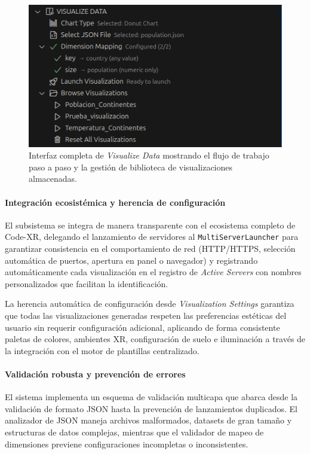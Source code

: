 \documentclass[a4paper, 12pt]{book}
\begin{document}
\begin{figure}[H]
\centering
\includegraphics[width=0.70\linewidth]{img/ui-visualize-data.png}
\caption{Interfaz completa de \emph{Visualize Data} mostrando el flujo de trabajo paso a paso y la gestión de biblioteca de visualizaciones almacenadas.}
\label{fig:ui-visualize-data}
\end{figure}

\paragraph{Integración ecosistémica y herencia de configuración}
El subsistema se integra de manera transparente con el ecosistema completo de Code-XR, delegando el lanzamiento de servidores al \texttt{MultiServerLauncher} para garantizar consistencia en el comportamiento de red (HTTP/HTTPS, selección automática de puertos, apertura en panel o navegador) y registrando automáticamente cada visualización en el registro de \emph{Active Servers} con nombres personalizados que facilitan la identificación.

La herencia automática de configuración desde \emph{Visualization Settings} garantiza que todas las visualizaciones generadas respeten las preferencias estéticas del usuario sin requerir configuración adicional, aplicando de forma consistente paletas de colores, ambientes XR, configuración de suelo e iluminación a través de la integración con el motor de plantillas centralizado.

\paragraph{Validación robusta y prevención de errores}
El sistema implementa un esquema de validación multicapa que abarca desde la validación de formato JSON hasta la prevención de lanzamientos duplicados. El analizador de JSON maneja archivos malformados, datasets de gran tamaño y estructuras de datos complejas, mientras que el validador de mapeo de dimensiones previene configuraciones incompletas o inconsistentes.
\end{document}

